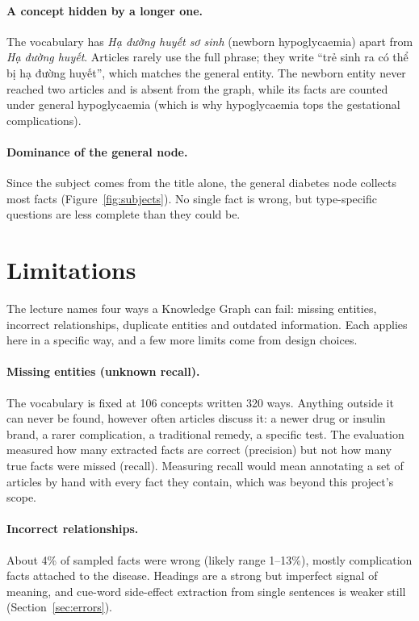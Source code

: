 \documentclass[11pt, a4paper]{article}
\begin{document}
\paragraph{A concept hidden by a longer one.} The vocabulary has \emph{Hạ đường huyết sơ sinh} (newborn hypoglycaemia) apart from \emph{Hạ đường huyết}. Articles rarely use the full phrase; they write ``trẻ sinh ra có thể bị hạ đường huyết'', which matches the general entity. The newborn entity never reached two articles and is absent from the graph, while its facts are counted under general hypoglycaemia (which is why hypoglycaemia tops the gestational complications).

\paragraph{Dominance of the general node.} Since the subject comes from the title alone, the general diabetes node collects most facts (Figure~\ref{fig:subjects}). No single fact is wrong, but type-specific questions are less complete than they could be.

\section{Limitations}
\label{sec:limitations}

The lecture names four ways a Knowledge Graph can fail: missing entities, incorrect relationships, duplicate entities and outdated information. Each applies here in a specific way, and a few more limits come from design choices.

\paragraph{Missing entities (unknown recall).} The vocabulary is fixed at 106 concepts written 320 ways. Anything outside it can never be found, however often articles discuss it: a newer drug or insulin brand, a rarer complication, a traditional remedy, a specific test. The evaluation measured how many extracted facts are correct (precision) but not how many true facts were missed (recall). Measuring recall would mean annotating a set of articles by hand with every fact they contain, which was beyond this project's scope.

\paragraph{Incorrect relationships.} About 4\% of sampled facts were wrong (likely range 1--13\%), mostly complication facts attached to the disease. Headings are a strong but imperfect signal of meaning, and cue-word side-effect extraction from single sentences is weaker still (Section~\ref{sec:errors}).
\end{document}
